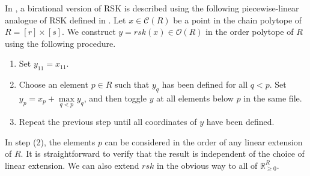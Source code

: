 \documentclass[ALCO,Unicode,published]{cedram}
\numberwithin{equation}{section}
\begin{document}







In \cite{farberhopkinstrongsiriwat}, a birational version of RSK is described using the following piecewise-linear analogue of RSK defined in \cite{hopkins,pak}.
Let $x \in \mathcal{C}(R)$ be a point in the chain polytope of $R=[r]\times[s]$. We construct $y = rsk(x) \in \mathcal O(R)$ in the order polytope of $R$ using the following procedure.

\begin{enumerate}
    \item Set $y_{11} = x_{11}$.
    \item Choose an element $p \in R$ such that $y_q$ has been defined for all $q < p$. Set $y_p = x_p + \max\limits_{q \lessdot p} y_q$, and then toggle $y$ at all elements below $p$ in the same file.
    \item Repeat the previous step until all coordinates of $y$ have been defined.
\end{enumerate}
In step (2), the elements $p$ can be considered in the order of any linear extension of $R$. It is straightforward to verify that the result is independent of the choice of linear extension. We can also extend $rsk$ in the obvious way to all of $\mathbb R_{\geq 0}^R$.
\end{document}
